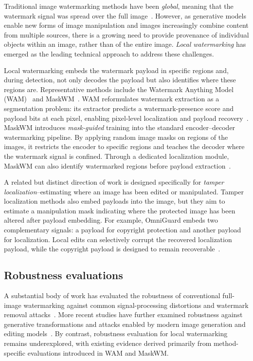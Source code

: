 \documentclass[sigconf,nonacm]{acmart}
\begin{document}
Traditional image watermarking methods have been {\it global}, meaning that the watermark signal was spread over the full image~\cite{synthid_image,pixelseal,trustmark}.
However, as generative models enable new forms of image manipulation and images increasingly combine content from multiple sources, there is a growing need to provide provenance of individual objects within an image, rather than of the entire image.
\emph{Local watermarking} has emerged as the leading technical approach to address these challenges.

Local watermarking embeds the watermark payload in specific regions and, during detection, not only decodes the payload but also identifies where these regions are. Representative methods include the Watermark Anything Model (WAM)~\cite{wam} and MaskWM~\cite{maskwm}. WAM reformulates watermark extraction as a segmentation problem: its extractor predicts a watermark-presence score and payload bits at each pixel, enabling pixel-level localization and payload recovery~\cite{wam}. MaskWM introduces {\it mask-guided} training into the standard encoder--decoder watermarking pipeline. By applying random image masks on regions of the images, it restricts the encoder to specific regions and teaches the decoder where the watermark signal is confined. Through a dedicated localization module, MaskWM can also identify watermarked regions before payload extraction~\cite{maskwm}.

A related but distinct direction of work is designed specifically for \emph{tamper localization}--estimating where an image has been edited or manipulated. Tamper localization methods also embed payloads into the image, but they aim to estimate a manipulation mask indicating where the protected image has been altered after payload embedding. For example, OmniGuard embeds two complementary signals: a payload for copyright protection and another payload for localization. Local edits can selectively corrupt the recovered localization payload, while the copyright payload is designed to remain recoverable~\cite{editguard,omniguard}.

\subsection{Robustness evaluations}

A substantial body of work has evaluated the robustness of conventional full-image watermarking against common signal-processing distortions and watermark removal attacks~\cite{voloshynovskiy2001attack,waves,eti_report}. More recent studies have further examined robustness against generative transformations and attacks enabled by modern image generation and editing models~\cite{zhao2024removable,diffusionbreak}. By contrast, robustness evaluation for local watermarking remains underexplored, with existing evidence derived primarily from method-specific evaluations introduced in WAM and MaskWM.
\end{document}
